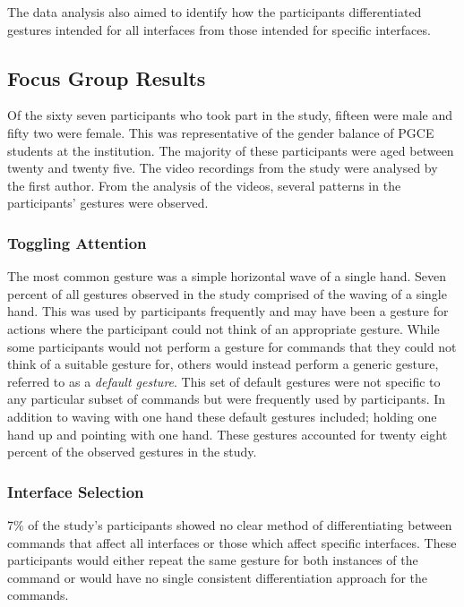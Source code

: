 \documentclass[link]{IWCOMP}
\begin{document}
The data analysis also aimed to identify how the participants differentiated gestures intended for all interfaces from those intended for specific interfaces.

\subsection{Focus Group Results}
\label{subsec:focusGroupResults}

Of the sixty seven participants who took part in the study, fifteen were male and fifty two were female.
This was representative of the gender balance of \ac{PGCE} students at the institution.
The majority of these participants were aged between twenty and twenty five.
The video recordings from the study were analysed by the first author.
From the analysis of the videos, several patterns in the participants' gestures were observed.

\subsubsection{Toggling Attention}
\label{subsubsec:focusGroupResultsTogglingAttention}

The most common gesture was a simple horizontal wave of a single hand.
Seven percent of all gestures observed in the study comprised of the waving of a single hand.
This was used by participants frequently and may have been a gesture for actions where the participant could not think of an appropriate gesture. 
While some participants would not perform a gesture for commands that they could not think of a suitable gesture for, others would instead perform a generic gesture, referred to as a \textit{default gesture}.
This set of default gestures were not specific to any particular subset of commands but were frequently used by participants.
In addition to waving with one hand these default gestures included; holding one hand up and pointing with one hand.
These gestures accounted for twenty eight percent of the observed gestures in the study.

\subsubsection{Interface Selection}
\label{subsubsec:focusGroupResultsInterfaceSelection}

7\% of the study's participants showed no clear method of differentiating between commands that affect all interfaces or those which affect specific interfaces. 
These participants would either repeat the same gesture for both instances of the command or would have no single consistent differentiation approach for the commands. 
\end{document}
